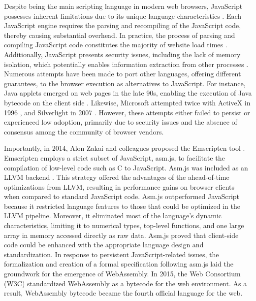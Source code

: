 Despite being the main scripting language in modern web browsers, JavaScript possesses inherent limitations due to its unique language characteristics \cite{mulazzani2013fast}.
Each JavaScript engine requires the parsing and recompiling of the JavaScript code, thereby causing substantial overhead.
In practice, the process of parsing and compiling JavaScript code constitutes the majority of website load times \cite{clark}.
Additionally, JavaScript presents security issues, including the lack of memory isolation, which potentially enables information extraction from other processes \cite{10.1145/1190216.1190252, 10.1145/3412841.3442001}.
Numerous attempts have been made to port other languages, offering different guarantees, to the browser execution as alternatives to JavaScript.
For instance, Java applets emerged on web pages in the late 90s, enabling the execution of Java bytecode on the client side \cite{javaapplet}.
Likewise, Microsoft attempted twice with ActiveX in 1996 \cite{activex}, and Silverlight in 2007 \cite{silverlight}.
However, these attempts either failed to persist or experienced low adoption, primarily due to security issues and the absence of consensus among the community of browser vendors.

 


Importantly, in 2014, Alon Zakai and colleagues proposed the Emscripten tool \cite{emscripten}.
Emscripten employs a strict subset of JavaScript, asm.js, to facilitate the compilation of low-level code such as C to JavaScript.
Asm.js was included as an LLVM backend \cite{asmjsweb}.
This strategy offered the advantages of the ahead-of-time optimizations from LLVM, resulting in performance gains on browser clients \cite{asmjs} when compared to standard JavaScript code.
Asm.js outperformed JavaScript because it restricted language features to those that could be optimized in the LLVM pipeline. 
Moreover, it eliminated most of the language's dynamic characteristics, limiting it to numerical types, top-level functions, and one large array in memory accessed directly as raw data.
Asm.js proved that client-side code could be enhanced with the appropriate language design and standardization.
In response to persistent JavaScript-related issues, the formalization and creation of a formal specification following asm.js laid the groundwork for the emergence of WebAssembly.
In 2015, the Web Consortium (W3C) standardized WebAssembly as a bytecode for the web environment.
As a result, WebAssembly bytecode became the fourth official language for the web.


